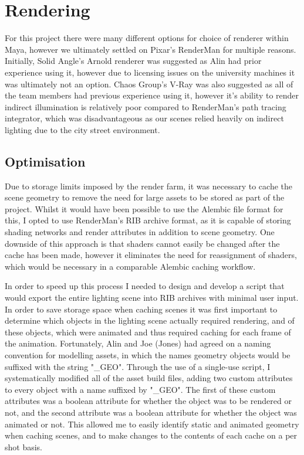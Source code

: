 \documentclass[11pt]{article}
\begin{document}
\newpage

\section{Rendering}

For this project there were many different options for choice of renderer within Maya, however we ultimately settled on Pixar's RenderMan for multiple reasons. Initially, Solid Angle's Arnold renderer was suggested as Alin had prior experience using it, however due to licensing issues on the university machines it was ultimately not an option. Chaos Group's V-Ray was also suggested as all of the team members had previous experience using it, however it's ability to render indirect illumination is relatively poor compared to RenderMan's path tracing integrator, which was disadvantageous as our scenes relied heavily on indirect lighting due to the city street environment.

\subsection{Optimisation} \label{rlslgt}

Due to storage limits imposed by the render farm, it was necessary to cache the scene geometry to remove the need for large assets to be stored as part of the project. Whilst it would have been possible to use the Alembic file format for this, I opted to use RenderMan's RIB archive format, as it is capable of storing shading networks and render attributes in addition to scene geometry. One downside of this approach is that shaders cannot easily be changed after the cache has been made, however it eliminates the need for reassignment of shaders, which would be necessary in a comparable Alembic caching workflow.

In order to speed up this process I needed to design and develop a script that would export the entire lighting scene into RIB archives with minimal user input. In order to save storage space when caching scenes it was first important to determine which objects in the lighting scene actually required rendering, and of these objects, which were animated and thus required caching for each frame of the animation. Fortunately, Alin and Joe (Jones) had agreed on a naming convention for modelling assets, in which the names geometry objects would be suffixed with the string "\_GEO". Through the use of a single-use script, I systematically modified all of the asset build files, adding two custom attributes to every object with a name suffixed by "\_GEO". The first of these custom attributes was a boolean attribute for whether the object was to be rendered or not, and the second attribute was a boolean attribute for whether the object was animated or not. This allowed me to easily identify static and animated geometry when caching scenes, and to make changes to the contents of each cache on a per shot basis.
\end{document}
